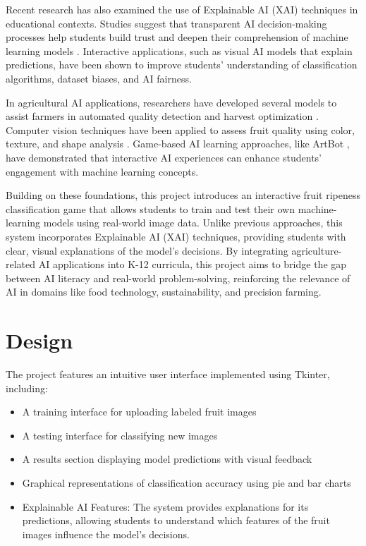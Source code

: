\documentclass[conference]{IEEEtran}
\begin{document}
Recent research has also examined the use of Explainable AI (XAI) techniques in educational contexts. Studies suggest that transparent AI decision-making processes help students build trust and deepen their comprehension of machine learning models \cite{wu2020, mon2023}. Interactive applications, such as visual AI models that explain predictions, have been shown to improve students' understanding of classification algorithms, dataset biases, and AI fairness.

In agricultural AI applications, researchers have developed several models to assist farmers in automated quality detection and harvest optimization \cite{bhasme2024}. Computer vision techniques have been applied to assess fruit quality using color, texture, and shape analysis \cite{bhasme2024}. Game-based AI learning approaches, like ArtBot \cite{pesek2022}, have demonstrated that interactive AI experiences can enhance students’ engagement with machine learning concepts.

Building on these foundations, this project introduces an interactive fruit ripeness classification game that allows students to train and test their own machine-learning models using real-world image data. Unlike previous approaches, this system incorporates Explainable AI (XAI) techniques, providing students with clear, visual explanations of the model's decisions. By integrating agriculture-related AI applications into K-12 curricula, this project aims to bridge the gap between AI literacy and real-world problem-solving, reinforcing the relevance of AI in domains like food technology, sustainability, and precision farming.

\section{Design}
The project features an intuitive user interface implemented using Tkinter, including:
\begin{itemize}
    \item A training interface for uploading labeled fruit images
    \item A testing interface for classifying new images
    \item A results section displaying model predictions with visual feedback
    \item Graphical representations of classification accuracy using pie and bar charts
    \item Explainable AI Features: The system provides explanations for its predictions, allowing students to understand which features of the fruit images influence the model's decisions.
\end{itemize}
\end{document}
